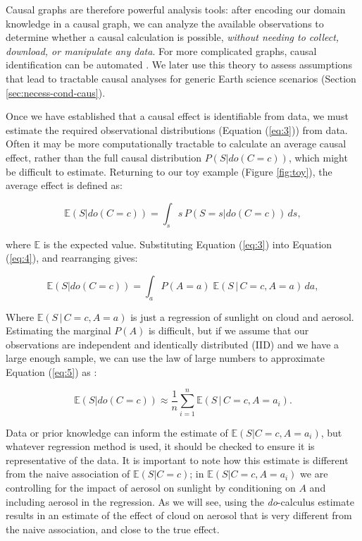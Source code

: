 \documentclass[12pt]{article}
\begin{document}
Causal graphs are therefore powerful analysis tools: after encoding
our domain knowledge in a causal graph, we can analyze the available
observations to determine whether a causal calculation is possible,
\textit{without needing to collect, download, or manipulate any
  data}. For more complicated graphs, causal identification can be
automated \citep[][ and \url{http://www.dagitty.net/},
\url{https://causalfusion.net}]{tian2002general,shpitser2006,huang2006identifiability,Bareinboim7345,
  textor2017}. We later use this theory to assess assumptions that
lead to tractable causal analyses for generic Earth science scenarios
(Section \ref{sec:necess-cond-caus}).

Once we have established that a causal effect is identifiable from
data, we must estimate the required observational distributions
(Equation (\ref{eq:3})) from data. Often it may be more
computationally tractable to calculate an average causal effect,
rather than the full causal distribution $P(S | do(C=c))$, which might be difficult to estimate. Returning
to our toy example (Figure \ref{fig:toy}), the average effect is
defined as:

\begin{equation} \mathbb{E}(S | do(C = c)) = \int_{s} s \, P(S = s |
  do(C=c)) \, ds,
  \label{eq:4}
\end{equation}

where $\mathbb{E}$ is the expected value. Substituting Equation
(\ref{eq:3}) into Equation (\ref{eq:4}), and rearranging gives:

\begin{equation} \mathbb{E}(S | do(C = c)) = \int_{a} P(A=a) \;
  \mathbb{E}(S \, | \, C=c, A=a) \, d a,
  \label{eq:5}
\end{equation}

Where $\mathbb{E}(S \, | \, C=c, A=a)$ is just a regression of
sunlight on cloud and aerosol. Estimating the marginal $P(A)$ is
difficult, but if we assume that our observations are independent and
identically distributed (IID) and we have a large enough sample, we
can use the law of large numbers to approximate Equation (\ref{eq:5})
as \citep{shalizi2013} :

\begin{equation} \mathbb{E}(S | do(C = c)) \approx \frac{1}{n}
  \sum_{i=1}^n \mathbb{E}(S \, | \, C=c, A=a_i).
  \label{eq:6}
\end{equation}

Data or prior knowledge can inform the estimate of
$\mathbb{E}(S | C=c, A=a_i)$, but whatever regression method is used,
it should be checked to ensure it is representative of the data. It is
important to note how this estimate is different from the naive
association of $\mathbb{E}(S | C=c)$; in $\mathbb{E}(S | C=c, A=a_i)$
we are controlling for the impact of aerosol on sunlight by
conditioning on $A$ and including aerosol in the regression. As we
will see, using the \textit{do}-calculus estimate results in an
estimate of the effect of cloud on aerosol that is very different from
the naive association, and close to the true effect.
\end{document}
